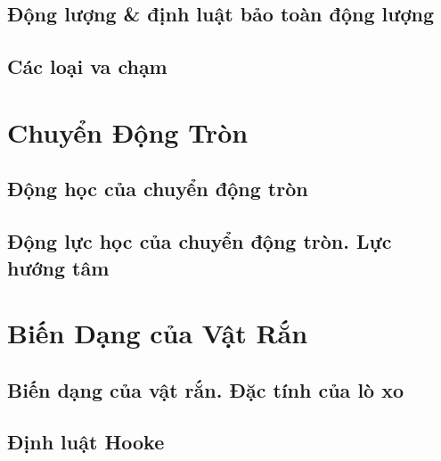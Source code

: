 \documentclass{article}
\numberwithin{equation}{section}
\begin{document}
\subsection{Động lượng \& định luật bảo toàn động lượng}


\subsection{Các loại va chạm}


\section{Chuyển Động Tròn}

\subsection{Động học của chuyển động tròn}


\subsection{Động lực học của chuyển động tròn. Lực hướng tâm}


\section{Biến Dạng của Vật Rắn}

\subsection{Biến dạng của vật rắn. Đặc tính của lò xo}


\subsection{Định luật Hooke}


\printbibliography[heading=bibintoc]
	
\end{document}
